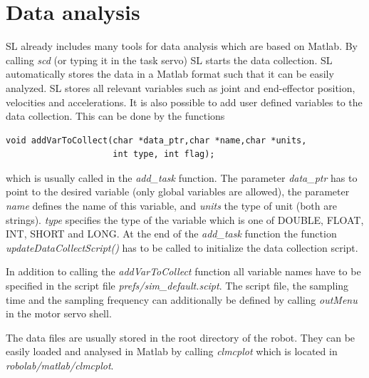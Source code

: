 \documentclass[11pt, article, colorback]{article}
\begin{document}
\section{Data analysis \label{se:SCD}}
SL already includes many tools for data analysis which are based on Matlab. By calling {\em scd} (or typing it in the task servo)  SL starts the data collection. SL automatically stores the data in a Matlab format such that it 
can be easily analyzed. SL stores all relevant variables such as joint and end-effector position, velocities and accelerations. It is also possible to add user defined variables to the data collection. This can be done by the functions
\begin{lstlisting}
void addVarToCollect(char *data_ptr,char *name,char *units, 
                     int type, int flag);
\end{lstlisting}
which is usually called in the {\em add\_task} function. The parameter {\em data\_ptr} has to point to the desired variable (only global variables are allowed), the parameter {\em name} defines the name of this variable, and {\em units} the type of unit (both are strings). {\em type} specifies
the type of the variable which is one of DOUBLE, FLOAT, INT, SHORT and LONG. At the end of the {\em add\_task} function the function {\em updateDataCollectScript()} has to be called to initialize the data collection script. 

In addition to calling the {\em addVarToCollect} function all variable names have to be specified in the script file {\em prefs/sim\_default.scipt}. The script file, the sampling time and the sampling frequency can additionally be defined by
calling {\em outMenu} in the motor servo shell. 

The data files are usually stored in the root directory of the robot. They can be easily loaded and analysed in Matlab by calling {\em clmcplot} which is located in {\em robolab/matlab/clmcplot}.





\end{document}
